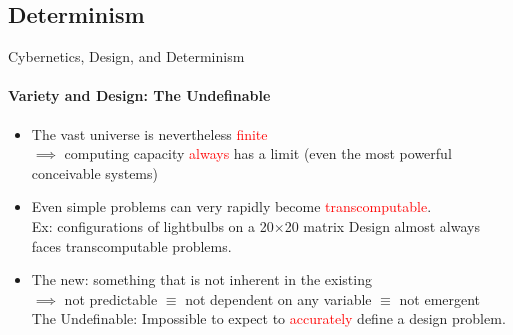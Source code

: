 \documentclass[
	11pt,
	aspectratio=169,
]{beamer}
\begin{document}
        \subsection{Determinism}
            \begin{frame}{Cybernetics, Design, and Determinism}
            \framesubtitle{Variety and Design: The Undefinable}
    		    \begin{itemize}
                    \item<1-> The vast universe is nevertheless \textcolor{red}{finite}\\
    		        $\implies$ computing capacity \textcolor{red}{always} has a limit (even the most powerful conceivable systems)
    		        \item<2-> Even simple problems can very rapidly become \textcolor{red}{transcomputable}.\\
    		            Ex: configurations of lightbulbs on a 20$\times$20 matrix
    		            Design almost always faces transcomputable problems.
		            \item<3-> The new: something that is not inherent in the existing \\
		            $\implies$ not predictable $\equiv$ not dependent on any variable $\equiv$ not emergent \\
    		        The Undefinable: Impossible to expect to \textcolor{red}{accurately} define a design problem.
    		    \end{itemize}
            \end{frame}
\end{document}
